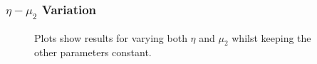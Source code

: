 \subsubsection*{$\eta -\mu_2$ Variation}
\begin{figure}[h]
    \centering
    \caption{Plots show results for varying both $\eta$ and $\mu_2$ whilst keeping the other parameters constant.}
    \label{fig:prolif_eta_mu_2_variation}
\end{figure}

